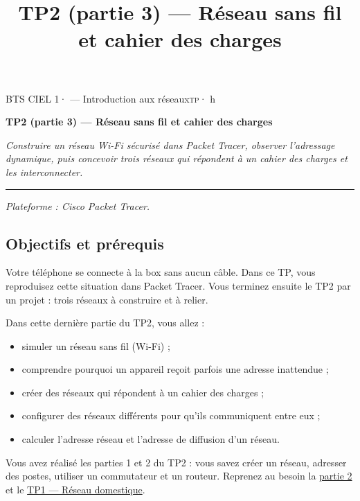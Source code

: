 \documentclass[
  french,
  10pt,
  a4paper,
]{scrartcl}
\title{TP2 (partie 3) --- Réseau sans fil et cahier des charges}
\author{}
\date{}
\providecommand{\tightlist}{%
  \setlength{\itemsep}{0pt}\setlength{\parskip}{0pt}}
\begin{document}
\thispagestyle{plain.scrheadings}
{\footnotesize\color{vertprofond}\textsc{BTS CIEL 1}\enspace·
--- Introduction aux réseaux\hfill \textsc{tp}\enspace· h\par}
\vspace{0.6ex}
{\LARGE\bfseries\color{vertprofond}TP2 (partie 3) --- Réseau sans fil et
cahier des charges\par}
\vspace{0.5ex}
{\itshape Construire un réseau Wi-Fi sécurisé dans Packet Tracer,
observer l'adressage dynamique, puis concevoir trois réseaux qui
répondent à un cahier des charges et les interconnecter.\par}
\vspace{0.3ex}
{\color{vertprofond}\rule{\linewidth}{0.8pt}\par}
\vspace{0.8ex}


\emph{Plateforme : Cisco Packet Tracer.}

\subsection{Objectifs et prérequis}\label{objectifs-et-pruxe9requis}

Votre téléphone se connecte à la box sans aucun câble. Dans ce TP, vous
reproduisez cette situation dans Packet Tracer. Vous terminez ensuite le
TP2 par un projet : trois réseaux à construire et à relier.

Dans cette dernière partie du TP2, vous allez :

\begin{itemize}
\tightlist
\item
  simuler un réseau sans fil (Wi-Fi) ;
\item
  comprendre pourquoi un appareil reçoit parfois une adresse inattendue
  ;
\item
  créer des réseaux qui répondent à un cahier des charges ;
\item
  configurer des réseaux différents pour qu'ils communiquent entre eux ;
\item
  calculer l'adresse réseau et l'adresse de diffusion d'un réseau.
\end{itemize}

Vous avez réalisé les parties 1 et 2 du TP2 : vous savez créer un
réseau, adresser des postes, utiliser un commutateur et un routeur.
Reprenez au besoin la \href{../tp-creation-lan-2/index.qmd}{partie 2} et
le \href{../tp-reseau-domestique/index.qmd}{TP1 --- Réseau domestique}.
\end{document}
